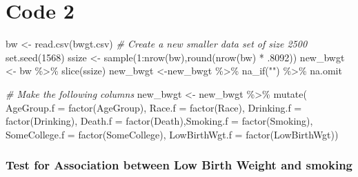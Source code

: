 \documentclass[
]{article}
\newenvironment{Shaded}{\begin{snugshade}}{\end{snugshade}}
\newcommand{\AttributeTok}[1]{\textcolor[rgb]{0.77,0.63,0.00}{#1}}
\newcommand{\CommentTok}[1]{\textcolor[rgb]{0.56,0.35,0.01}{\textit{#1}}}
\newcommand{\DecValTok}[1]{\textcolor[rgb]{0.00,0.00,0.81}{#1}}
\newcommand{\FunctionTok}[1]{\textcolor[rgb]{0.00,0.00,0.00}{#1}}
\newcommand{\NormalTok}[1]{#1}
\newcommand{\OtherTok}[1]{\textcolor[rgb]{0.56,0.35,0.01}{#1}}
\newcommand{\SpecialCharTok}[1]{\textcolor[rgb]{0.00,0.00,0.00}{#1}}
\newcommand{\StringTok}[1]{\textcolor[rgb]{0.31,0.60,0.02}{#1}}
\begin{document}
\newpage

\hypertarget{code-2}{%
\section{Code 2}\label{code-2}}

\begin{Shaded}
\begin{Highlighting}[]
\NormalTok{bw }\OtherTok{\textless{}{-}} \FunctionTok{read.csv}\NormalTok{(}\StringTok{\textquotesingle{}bwgt.csv\textquotesingle{}}\NormalTok{)}
\CommentTok{\# Create a new smaller data set of size 2500}
\FunctionTok{set.seed}\NormalTok{(}\DecValTok{1568}\NormalTok{)}
\NormalTok{ssize }\OtherTok{\textless{}{-}} \FunctionTok{sample}\NormalTok{(}\DecValTok{1}\SpecialCharTok{:}\FunctionTok{nrow}\NormalTok{(bw),}\FunctionTok{round}\NormalTok{(}\FunctionTok{nrow}\NormalTok{(bw) }\SpecialCharTok{*}\NormalTok{ .}\DecValTok{8092}\NormalTok{))}
\NormalTok{new\_bwgt }\OtherTok{\textless{}{-}}\NormalTok{ bw }\SpecialCharTok{\%\textgreater{}\%} \FunctionTok{slice}\NormalTok{(ssize)}
\NormalTok{new\_bwgt }\OtherTok{\textless{}{-}}\NormalTok{new\_bwgt  }\SpecialCharTok{\%\textgreater{}\%} \FunctionTok{na\_if}\NormalTok{(}\StringTok{""}\NormalTok{) }\SpecialCharTok{\%\textgreater{}\%}\NormalTok{  na.omit}
 
\CommentTok{\# Make the following columns }
\NormalTok{new\_bwgt }\OtherTok{\textless{}{-}}\NormalTok{ new\_bwgt }\SpecialCharTok{\%\textgreater{}\%} \FunctionTok{mutate}\NormalTok{( }\AttributeTok{AgeGroup.f =} \FunctionTok{factor}\NormalTok{(AgeGroup), }\AttributeTok{Race.f =} \FunctionTok{factor}\NormalTok{(Race), }
\AttributeTok{Drinking.f =} \FunctionTok{factor}\NormalTok{(Drinking), }\AttributeTok{Death.f =} \FunctionTok{factor}\NormalTok{(Death),}\AttributeTok{Smoking.f =} \FunctionTok{factor}\NormalTok{(Smoking),}
\AttributeTok{SomeCollege.f =} \FunctionTok{factor}\NormalTok{(SomeCollege), }\AttributeTok{LowBirthWgt.f =} \FunctionTok{factor}\NormalTok{(LowBirthWgt))}
\end{Highlighting}
\end{Shaded}

\hypertarget{test-for-association-between-low-birth-weight-and-smoking}{%
\subsubsection{Test for Association between Low Birth Weight and
smoking}\label{test-for-association-between-low-birth-weight-and-smoking}}
\end{document}
